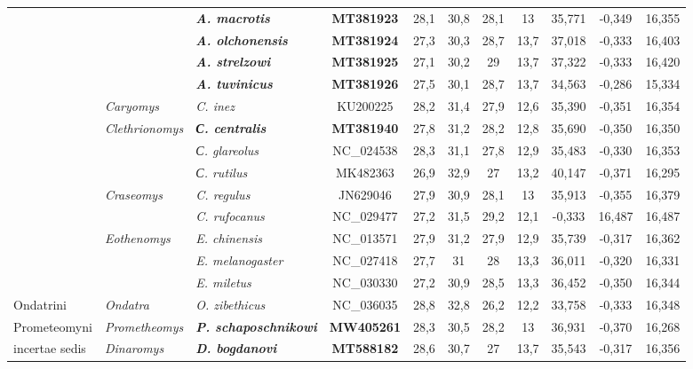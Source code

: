 \begin{landscape}
\begin{longtable}{|l|l|l|c|c|c|c|c|c|c|c|}
				&  & \textit{\textbf{A. macrotis}} & \textbf{MT381923} & 28,1 & 30,8 & 28,1 & 13 & 35,771 & -0,349 & 16,355 \\ \cline{3-11} 
				&  & \textit{\textbf{A. olchonensis}} & \textbf{MT381924} & 27,3 & 30,3 & 28,7 & 13,7 & 37,018 & -0,333 & 16,403 \\ \cline{3-11} 
				&  & \textit{\textbf{A. strelzowi}} & \textbf{MT381925} & 27,1 & 30,2 & 29 & 13,7 & 37,322 & -0,333 & 16,420 \\ \cline{3-11} 
				&  & \textit{\textbf{A. tuvinicus}} & \textbf{MT381926} & 27,5 & 30,1 & 28,7 & 13,7 & 34,563 & -0,286 & 15,334 \\ \cline{2-11} 
				& \textit{Caryomys} & \textit{C. inez} & KU200225 & 28,2 & 31,4 & 27,9 & 12,6 & 35,390 & -0,351 & 16,354 \\ \cline{2-11} 
				& \multirow{3}{*}{\textit{Clethrionomys}} & \textit{\textbf{С. centralis}} & \textbf{MT381940} & 27,8 & 31,2 & 28,2 & 12,8 & 35,690 & -0,350 & 16,350 \\ \cline{3-11} 
				&  & \textit{С. glareolus} & NC\_024538 & 28,3 & 31,1 & 27,8 & 12,9 & 35,483 & -0,330 & 16,353 \\ \cline{3-11} 
				&  & \textit{С. rutilus} & MK482363 & 26,9 & 32,9 & 27 & 13,2 & 40,147 & -0,371 & 16,295 \\ \cline{2-11} 
				& \multirow{2}{*}{\textit{Craseomys}} & \textit{C. regulus} & JN629046 & 27,9 & 30,9 & 28,1 & 13 & 35,913 & -0,355 & 16,379 \\ \cline{3-11} 
				&  & \textit{C. rufocanus} & NC\_029477 & 27,2 & 31,5 & 29,2 & 12,1 & -0,333 & 16,487 & 16,487 \\ \cline{2-11} 
				& \multirow{3}{*}{\textit{Eothenomys}} & \textit{E. chinensis} & NC\_013571 & 27,9 & 31,2 & 27,9 & 12,9 & 35,739 & -0,317 & 16,362 \\ \cline{3-11} 
				&  & \textit{E. melanogaster} & NC\_027418 & 27,7 & 31 & 28 & 13,3 & 36,011 & -0,320 & 16,331 \\ \cline{3-11} 
				&  & \textit{E. miletus} & NC\_030330 & 27,2 & 30,9 & 28,5 & 13,3 & 36,452 & -0,350 & 16,344 \\ \hline
				Ondatrini & \textit{Ondatra} & \textit{O. zibethicus} & NC\_036035 & 28,8 & 32,8 & 26,2 & 12,2 & 33,758 & -0,333 & 16,348 \\ \hline
				Prometeomyni & \textit{Prometheomys} & \textit{\textbf{P. schaposchnikowi}} & \textbf{MW405261} & 28,3 & 30,5 & 28,2 & 13 & 36,931 & -0,370 & 16,268 \\ \hline
				incertae sedis & \textit{Dinaromys} & \textit{\textbf{D. bogdanovi}} & \textbf{MT588182} & 28,6 & 30,7 & 27 & 13,7 & 35,543 & -0,317 & 16,356 \\ \hline

\end{longtable}
\end{landscape}
